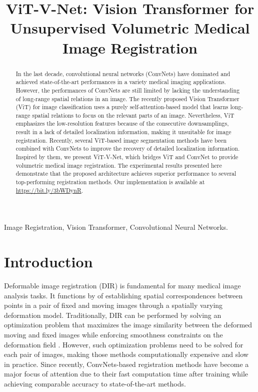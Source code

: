 \documentclass{midl}
\title[ViT-V-Net for Volumetric Medical Image Registration]{ViT-V-Net: Vision Transformer for Unsupervised Volumetric Medical Image Registration}
\begin{document}
\maketitle
\vspace{-12mm}

\begin{abstract}
In the last decade, convolutional neural networks (ConvNets) have dominated and achieved state-of-the-art performances in a variety medical imaging applications. However, the performances of ConvNets are still limited by lacking the understanding of long-range spatial relations in an image. The recently proposed Vision Transformer (ViT) for image classification uses a purely self-attention-based model that learns long-range spatial relations to focus on the relevant parts of an image. Nevertheless, ViT emphasizes the low-resolution features because of the consecutive downsamplings, result in a lack of detailed localization information, making it unsuitable for image registration. Recently, several ViT-based image segmentation methods have been combined with ConvNets to improve the recovery of detailed localization information. Inspired by them, we present ViT-V-Net, which bridges ViT and ConvNet to provide volumetric medical image registration. The experimental results presented here demonstrate that the proposed architecture achieves superior performance to several top-performing registration methods. Our implementation is available at \url{https://bit.ly/3bWDynR}.
\end{abstract}

\begin{keywords}
Image Registration, Vision Transformer, Convolutional Neural Networks.
\end{keywords}

\vspace{-4mm}

\section{Introduction}
\vspace{-1mm}
Deformable image registration (DIR) is fundamental for many medical image analysis tasks. It functions by of establishing spatial correspondences between points in a pair of fixed and moving images through a spatially varying deformation model. Traditionally, DIR can be performed by solving an optimization problem that maximizes the image similarity between the deformed moving and fixed images while enforcing smoothness constraints on the deformation field \cite{beg2005computing, avants2008symmetric, vercauteren2009diffeomorphic}. However, such optimization problems need to be solved for each pair of images, making those methods computationally expensive and slow in practice. Since recently, ConvNets-based registration methods \cite{de2017end, balakrishnan2018unsupervised, sokooti2017nonrigid, chen2020generating} have become a major focus of attention due to their fast computation time after training while achieving comparable accuracy to state-of-the-art methods. 
\end{document}
